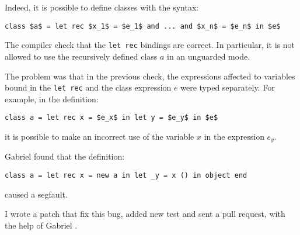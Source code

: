 \documentclass{article}
\begin{document}
Indeed, it is possible to define classes with the syntax:
\begin{lstlisting}[mathescape=true]
class $a$ = let rec $x_1$ = $e_1$ and ... and $x_n$ = $e_n$ in $e$
\end{lstlisting}
The compiler check that the \lstinline|let rec| bindings are correct. In
particular, it is not allowed to use the recursively defined class $a$ in an
unguarded mode.

The problem was that in the previous check, the expressions affected to
variables bound in the \lstinline|let rec| and the class expression $e$ were
typed separately. For example, in the definition:
\begin{lstlisting}[mathescape=true]
class a = let rec x = $e_x$ in let y = $e_y$ in $e$
\end{lstlisting}
it is possible to make an incorrect use of the variable $x$ in the expression
$e_y$.

Gabriel found that the definition:
\begin{lstlisting}
class a = let rec x = new a in let _y = x () in object end
\end{lstlisting}
caused a segfault.

I wrote a patch that fix this bug, added new test and sent a pull request,
with the help of Gabriel \cite{PullRequest}.




\end{document}
